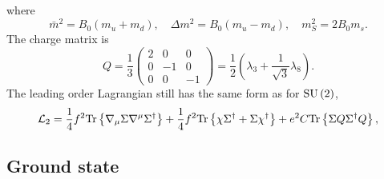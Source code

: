 %
where
%
\begin{equation}
    \bar m^2 =  B_0(m_u + m_d),\quad 
    \Delta m^2 = B_0(m_u - m_d), \quad
    m_S^2 = 2B_0 m_s.
\end{equation}
%
The charge matrix is
%
\begin{equation}
    \label{three-flavor charge matrix}
    Q = \frac{1}{3}
    \begin{pmatrix}
        2 & 0 & 0\\
        0 & -1 & 0\\
        0 & 0 & -1
    \end{pmatrix}
    = \frac{1}{2} \left( \lambda_3 + \frac{1}{\sqrt{3}} \lambda_8 \right).
\end{equation}
%
The leading order Lagrangian still has the same form as for $\text{SU}\left(2\right)$,
%
\begin{equation}
    \label{leading order three-flavor lagrangian}
    \mathcal{L}_2 
    = \frac{1}{4}f^2 \text{Tr} \left\{ \nabla_\mu \Sigma \nabla^\mu \Sigma^\dagger \right\}
    + \frac{1}{4}f^2 \text{Tr} \left\{ \chi \Sigma^\dagger + \Sigma \chi^\dagger \right\}
    + e^2 C \text{Tr} \left\{ \Sigma Q \Sigma^\dagger Q \right\},
\end{equation}
%


\subsection{Ground state}

